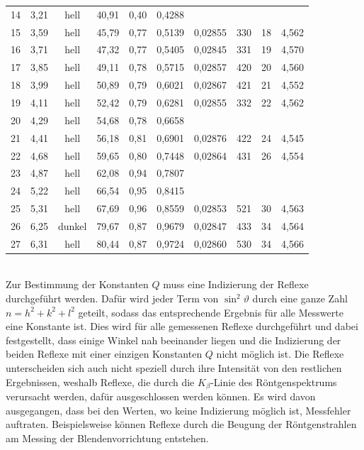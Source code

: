 \documentclass[a4paper,twoside,final]{article}
\begin{document}
\begin{table}[ht]
\begin{tabular}{l c c c c c | c c c c}
14 & 3,21 & hell      & 40,91 & 0,40 & 0,4288 &         &     &    &       \\
15 & 3,59 & hell      & 45,79 & 0,77 & 0,5139 & 0,02855 & 330 & 18 & 4,562 \\
16 & 3,71 & hell      & 47,32 & 0,77 & 0,5405 & 0,02845 & 331 & 19 & 4,570 \\
17 & 3,85 & hell      & 49,11 & 0,78 & 0,5715 & 0,02857 & 420 & 20 & 4,560 \\
18 & 3,99 & hell      & 50,89 & 0,79 & 0,6021 & 0,02867 & 421 & 21 & 4,552 \\
19 & 4,11 & hell      & 52,42 & 0,79 & 0,6281 & 0,02855 & 332 & 22 & 4,562 \\
20 & 4,29 & hell      & 54,68 & 0,78 & 0,6658 &         &     &    &       \\
21 & 4,41 & hell      & 56,18 & 0,81 & 0,6901 & 0,02876 & 422 & 24 & 4,545 \\
22 & 4,68 & hell      & 59,65 & 0,80 & 0,7448 & 0,02864 & 431 & 26 & 4,554 \\
23 & 4,87 & hell      & 62,08 & 0,94 & 0,7807 &         &     &    &       \\
24 & 5,22 & hell      & 66,54 & 0,95 & 0,8415 &         &     &    &       \\
25 & 5,31 & hell      & 67,69 & 0,96 & 0,8559 & 0,02853 & 521 & 30 & 4,563 \\
26 & 6,25 & dunkel    & 79,67 & 0,87 & 0,9679 & 0,02847 & 433 & 34 & 4,564 \\
27 & 6,31 & hell      & 80,44 & 0,87 & 0,9724 & 0,02860 & 530 & 34 & 4,566
	\end{tabular}
\end{table}\\
Zur Bestimmung der Konstanten $Q$ muss eine Indizierung der Reflexe durchgeführt werden. Dafür wird jeder Term von $\sin^2 \vartheta $ durch eine ganze Zahl $n = h^2 + k^2 + l^2$ geteilt, sodass das entsprechende Ergebnis für alle Messwerte eine Konstante ist. Dies wird für alle gemessenen Reflexe durchgeführt und dabei festgestellt, dass einige Winkel nah beeinander liegen und die Indizierung der beiden Reflexe mit einer einzigen Konstanten $Q$ nicht möglich ist. Die Reflexe unterscheiden sich auch nicht speziell durch ihre Intensität von den restlichen Ergebnissen, weshalb Reflexe, die durch die $K_\beta$-Linie des Röntgenspektrums verursacht werden, dafür ausgeschlossen werden können. Es wird davon ausgegangen, dass bei den Werten, wo keine Indizierung möglich ist, Messfehler auftraten. Beispielsweise können Reflexe durch die Beugung der Röntgenstrahlen am Messing der Blendenvorrichtung entstehen.
\end{document}
